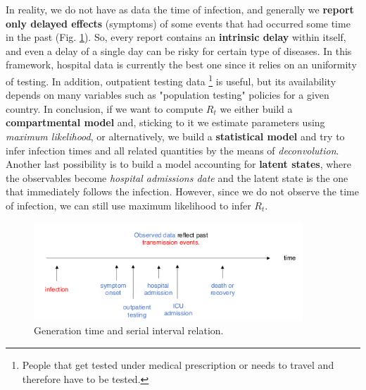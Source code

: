 \documentclass[../main/main.tex]{subfiles}
\begin{document}
In reality, we do not have as data the time of infection, and generally we \textbf{report only delayed effects} (symptoms) of some events that had occurred some time in the past (Fig. \ref{fig:22_08}). So, every report contains an \textbf{intrinsic delay} within itself, and even a delay of a single day can be risky for certain type of diseases. In this framework, hospital data is currently the best one since it relies on an uniformity of testing. In addition, outpatient testing data \footnote{People that get tested under medical prescription or needs to travel and therefore have to be tested.} is useful, but its availability depends on many variables such as "population testing" policies for a given country. In conclusion, if we want to compute $R_t$ we either build a \textbf{compartmental model} and, sticking to it we estimate parameters using \textit{maximum likelihood}, or alternatively, we build a \textbf{statistical model} and try to infer infection times and all related quantities by the means of \textit{deconvolution}. Another last possibility is to build a model accounting for \textbf{latent states}, where the observables become \textit{hospital admissions date} and the latent state is the one that immediately follows the infection. However, since we do not observe the time of infection, we can still use maximum likelihood to infer $R_t$.

\begin{figure}[h!]
\centering
\includegraphics[width=0.90\textwidth]{../lessons/image/22/image08.png}
\caption{\label{fig:22_08} Generation time and serial interval relation.}
\end{figure}
\end{document}
